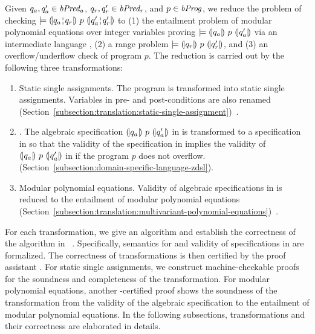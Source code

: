 
Given $q_a, q_a' \in \mathit{bPred_a}$, $q_r, q_r' \in \mathit{bPred_r}$, and $p \in \mathit{bProg}$, we reduce the problem of checking $\models \hoaretriple{q_a \andar q_r}{p}{q_a' \andar q_r'}$ to (1) the entailment problem of modular
polynomial equations over integer variables proving $\models {(\!|}{q_a}{|\!)}~{p}~{(\!|}{q_a'}{|\!)}$ via an intermediate language \zdsl, (2) a range problem $\models {(\!|}{q_r}{|\!)}~{p}~{(\!|}{q_r'}{|\!)}$, and (3) an overflow/underflow check of program $p$.
The reduction is carried out by the following three transformations:
\begin{enumerate}
\item Static single assignments. The program is transformed
  into static single assignments. Variables in pre- and
  post-conditions are also renamed
  (Section~\ref{subsection:translation:static-single-assignment})~\cite{AWZ:88:DQVP}.
\item \zdsl. The algebraic specification ${(\!|}{q_a}{|\!)}~{p}~{(\!|}{q_a'}{|\!)}$ in \bvdsl is transformed to a specification in \zdsl so that the validity of the specification in \zdsl implies the validity of ${(\!|}{q_a}{|\!)}~{p}~{(\!|}{q_a'}{|\!)}$ in \bvdsl if the program $p$ does not overflow. (Section~\ref{subsection:domain-specific-language-zdsl}).
\item Modular polynomial equations. Validity of algebraic specifications in \zdsl
  is reduced to the entailment of modular polynomial equations
  (Section~\ref{subsection:translation:multivariant-polynomial-equations})~\cite{H:07:AENTP}.
\end{enumerate}

For each transformation, we give an algorithm and establish the
correctness of the algorithm in \coq~\cite{YC:2004:ITPPDC}.
Specifically, semantics for \zdsl and validity of specifications in \zdsl are formalized.
The correctness of transformations is then certified by the proof assistant \coq.
For static single assignments, we
construct machine-checkable proofs for the soundness and completeness
of the transformation. For modular polynomial equations, another
\coq-certified proof shows the soundness of the transformation
from the validity of the algebraic specification to the entailment of
modular polynomial equations. In the following subsections,
transformations and their correctness are elaborated in details.
